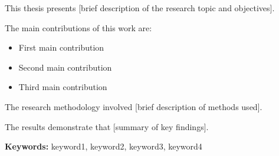 This thesis presents [brief description of the research topic and objectives].

The main contributions of this work are:
\begin{itemize}
    \item First main contribution
    \item Second main contribution
    \item Third main contribution
\end{itemize}

The research methodology involved [brief description of methods used].

The results demonstrate that [summary of key findings].

\textbf{Keywords:} keyword1, keyword2, keyword3, keyword4

